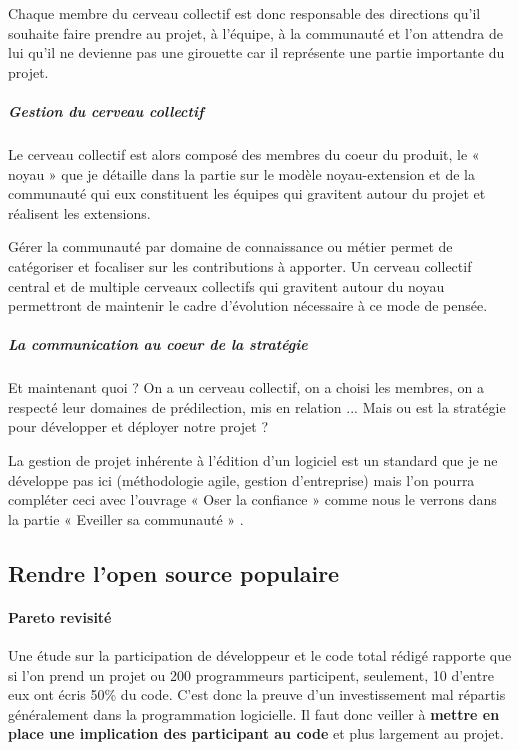 					Chaque membre du cerveau collectif est donc responsable des directions qu'il souhaite faire prendre au projet, à l'équipe, à la communauté et l'on attendra de lui qu'il ne devienne pas une girouette car il représente une partie importante du projet.

				\subparagraph{Gestion du cerveau collectif\\}

					Le cerveau collectif est alors composé des membres du coeur du produit, le « noyau » que je détaille dans la partie sur le modèle noyau-extension et de la communauté qui eux constituent les équipes qui gravitent autour du projet et réalisent les extensions.

					Gérer la communauté par domaine de connaissance ou métier permet de catégoriser et focaliser sur les contributions à apporter.
					Un cerveau collectif central et de multiple cerveaux collectifs qui gravitent autour du noyau permettront de maintenir le cadre d'évolution nécessaire à ce mode de pensée.

				\subparagraph{La communication au coeur de la stratégie\\}

					Et maintenant quoi ? On a un cerveau collectif, on a choisi les membres, on a respecté leur domaines de prédilection, mis en relation ... Mais ou est la stratégie pour développer et déployer notre projet ?

					La gestion de projet inhérente à l'édition d'un logiciel est un standard que je ne développe pas ici (méthodologie agile, gestion d'entreprise) mais l'on pourra compléter ceci avec l'ouvrage « Oser la confiance » comme nous le verrons dans la partie « Eveiller sa communauté » .

		\subsection{Rendre l'open source populaire}

			\paragraph{Pareto revisité\\}

				Une étude sur la participation de développeur et le code total rédigé rapporte que si l'on prend un projet ou 200 programmeurs participent, seulement, 10 d'entre eux ont écris 50\% du code. C'est donc la preuve d'un investissement mal répartis généralement dans la programmation logicielle. Il faut donc veiller à \textbf{mettre en place une implication des participant au code} et plus largement au projet.

